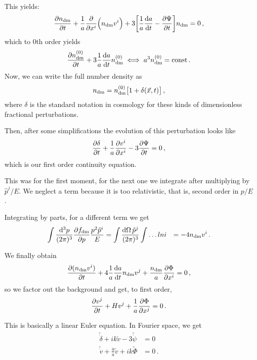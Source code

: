 \documentclass[main.tex]{subfiles}
\begin{document}
This yields: 
%
\begin{align}
\pdv{n _{\text{dm}}}{t} + \frac{1}{a} \pdv{}{x^{i}} \qty(n _{\text{dm}} v^{i}) + 3 \qty[\frac{1}{a} \dv{a}{t}  - \pdv{\Psi }{t}] n _{\text{dm}} = 0
\,,
\end{align}
%
which to 0th order yields 
%
\begin{align}
\pdv{n _{\text{dm}}^{(0)}}{t} + 3 \frac{1}{a} \dv{a}{t} n _{\text{dm}}^{(0)} \iff a^3 n _{\text{dm}}^{(0)} = \text{const}
\,.
\end{align}
%
Now, we can write the full number density as 
%
\begin{align}
n _{\text{dm}} = n _{\text{dm}}^{(0)} \qty[1 + \delta (\vec{x}, t)]
\,,
\end{align}
%
where \(\delta \) is the standard notation in cosmology for these kinds of dimensionless fractional perturbations. 

Then, after some simplifications the evolution of this perturbation looks like 
%
\begin{align}
\pdv{ \delta  }{t} + \frac{1}{a} \pdv{v^{i}}{x^{i}} - 3 \pdv{\Psi }{t}=0
\,,
\end{align}
%
which is our first order continuity equation. 

This was for the first moment, for the next one we integrate after multiplying by \(\hat{p}^{j} / E\). 
We neglect a term because it is too relativistic, that is, second order in \(p / E\). 

Integrating by parts, for a different term we get 
%
\begin{align}
\int  \frac{ \dd[3]{p}}{(2\pi )^3} \pdv{f _{\text{dm}}}{p} \frac{p^2 \hat{p}^{i}}{E} &= \int \frac{ \dd{\Omega  } \hat{p}^{j}}{(2 \pi )^3}
\int \dots lni
&= - 4 n _{\text{dm}} v^{i}
\,.
\end{align}

We finally obtain 
%
\begin{align}
\pdv{(n _{\text{dm}} v^{i})}{t} + 4 \frac{1}{a} \dv{a}{t} n _{\text{dm}}v^{j} + \frac{n _{\text{dm}}}{a} \pdv{\Phi  }{x^{i}} =0
\,,
\end{align}
%
so we factor out the background and get, to first order, 
%
\begin{align}
\pdv{v^{j}}{t} + H v^{j} + \frac{1}{a} \pdv{\Phi }{x^{j}}=0
\,.
\end{align}

This is basically a linear Euler equation. In Fourier space, we get 
%
\begin{subequations}
\begin{align}
\widetilde{\dot{\delta}} + i k \widetilde{v} - 3 \widetilde{\dot{\psi}} &= 0  \\
\widetilde{\dot{v}} + \frac{\dot{a}}{a} \widetilde{v} + i k \widetilde{\Phi} &= 0
\,.
\end{align}
\end{subequations}
\end{document}
